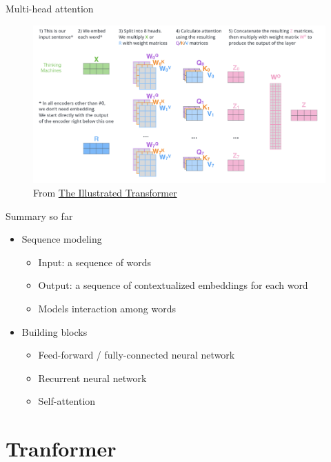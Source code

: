 \documentclass[usenames,dvipsnames,notes,11pt,aspectratio=169,hyperref={colorlinks=true, linkcolor=blue}]{beamer}
\begin{document}
\begin{frame}
    {Multi-head attention}
    \begin{figure}
        \includegraphics[width=.9\textwidth]{figures/multi-head-matrix}
        \caption{From \href{https://jalammar.github.io/illustrated-transformer}{The Illustrated Transformer}}
    \end{figure}
\end{frame}

\begin{frame}
    {Summary so far}
    \begin{itemize}
        \item Sequence modeling
            \begin{itemize}
                \item Input: a sequence of words
                \item Output: a sequence of contextualized embeddings for each word
                \item Models interaction among words
            \end{itemize}
            \pause
        \item Building blocks 
            \begin{itemize}
                \item Feed-forward / fully-connected neural network
                \item Recurrent neural network
                \item Self-attention
            \end{itemize}
            \pause
    \end{itemize}
\end{frame}

\section{Tranformer}
\end{document}
